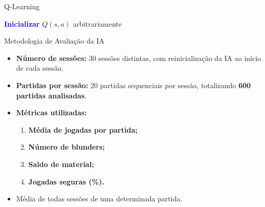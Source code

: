 \documentclass{beamer}
\begin{document}
\begin{frame}[fragile]{Q-Learning}
\begin{center}
\begin{minipage}{0.85\linewidth} %
\begin{algorithm}[H]
\DontPrintSemicolon
\textcolor{blue}{\textbf{Inicializar}} $Q(s, a)$ arbitrariamente\;
\end{algorithm}
\end{minipage}
\end{center}
\end{frame}


\begin{frame}{Metodologia de Avaliação da IA}
  \begin{itemize}
    \item \textbf{Número de sessões:} 30 sessões distintas, com reinicialização da IA ao início de cada sessão.
    
    \item \textbf{Partidas por sessão:} 20 partidas sequenciais por sessão, totalizando \textbf{600 partidas analisadas}.

    \item \textbf{Métricas utilizadas:}
    \begin{enumerate}
      \item \textbf{Média de jogadas por partida;}
      \item \textbf{Número de blunders;}
      \item \textbf{Saldo de material;}
      \item \textbf{Jogadas seguras (\%).}
    \end{enumerate}
    \item Média de todas sessões de uma determinada partida.
  \end{itemize}
\end{frame}
\end{document}
